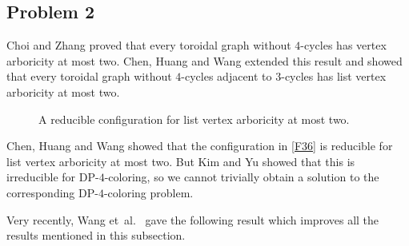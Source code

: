 \documentclass{article}
\theoremstyle{definition}
\newcommand{\etal}{et~al.\ }
\begin{document}
\subsection{Problem 2}
Choi and Zhang \cite{MR3233411} proved that every toroidal graph without $4$-cycles has vertex arboricity at most two. Chen, Huang and Wang \cite{MR3508765} extended this result and showed that every toroidal graph without $4$-cycles adjacent to $3$-cycles has list vertex arboricity at most two.

\begin{figure}[htbp]%
\centering
{}
\caption{A reducible configuration for list vertex arboricity at most two.}
\label{F36}
\end{figure}
Chen, Huang and Wang \cite{MR3508765} showed that the configuration in \autoref{F36} is reducible for list vertex arboricity at most two. But Kim and Yu \cite{MR3969022} showed that this is irreducible for DP-$4$-coloring, so we cannot trivially obtain a solution to the corresponding DP-$4$-coloring problem. 

Very recently, Wang \etal \cite{Wang2019+} gave the following result which improves all the results mentioned in this subsection. 
\end{document}
